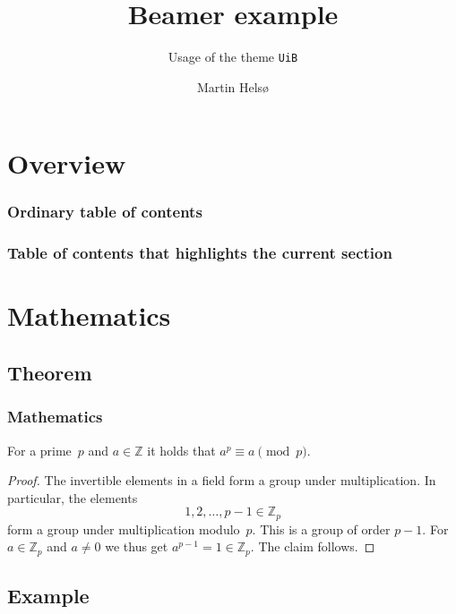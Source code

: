 \documentclass[UKenglish]{beamer}
\author{Martin Helsø}
\title{Beamer example}
\subtitle{Usage of the theme \texttt{UiB}}
\begin{document}
\section{Overview}


%
%
\begin{frame}
    \frametitle{Ordinary table of contents}
    \tableofcontents
\end{frame}

\begin{frame}
    \frametitle{Table of contents that highlights the current section}
    \tableofcontents[currentsection]
\end{frame}

\section{Mathematics}
\subsection{Theorem}

\begin{frame}
    \frametitle{Mathematics}

    \begin{theorem}
        For a prime~\(p\) and \(a \in \mathbb{Z}\) it holds that \(a^p \equiv a \pmod{p}\).
    \end{theorem}

    \begin{proof}
        The invertible elements in a field form a group under multiplication.
        In particular, the elements
        \begin{equation*}
            1, 2, \ldots, p - 1 \in \mathbb{Z}_p
        \end{equation*}
        form a group under multiplication modulo~\(p\).
        This is a group of order \(p - 1\).
        For \(a \in \mathbb{Z}_p\) and \(a \neq 0\) we thus get \(a^{p-1} = 1 \in \mathbb{Z}_p\).
        The claim follows.
    \end{proof}
\end{frame}

\subsection{Example}
\end{document}
